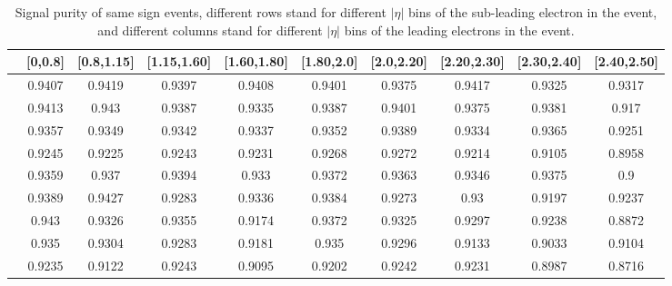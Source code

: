 \begin{table}
\footnotesize
\centering
\begin{tabular}{c|c|c|c|c|c|c|c|c|c}
  \hline
   &[0,0.8] &[0.8,1.15] &[1.15,1.60] &[1.60,1.80] &[1.80,2.0] &[2.0,2.20] &[2.20,2.30] &[2.30,2.40] &[2.40,2.50] \\
  \hline
  [0,0.8] &0.9407 &0.9419 &0.9397 &0.9408 &0.9401 &0.9375 &0.9417 &0.9325 &0.9317 \\
  \hline
  [0.8,1.15] &0.9413 &0.943 &0.9387 &0.9335 &0.9387 &0.9401 &0.9375 &0.9381 &0.917 \\
  \hline
  [1.15,1.60] &0.9357 &0.9349 &0.9342 &0.9337 &0.9352 &0.9389 &0.9334 &0.9365 &0.9251 \\
  \hline
  [1.60,1.80] &0.9245 &0.9225 &0.9243 &0.9231 &0.9268 &0.9272 &0.9214 &0.9105 &0.8958 \\
  \hline
  [1.80,2.0] &0.9359 &0.937 &0.9394 &0.933 &0.9372 &0.9363 &0.9346 &0.9375 &0.9 \\
  \hline
  [2.0,2.20] &0.9389 &0.9427 &0.9283 &0.9336 &0.9384 &0.9273 &0.93 &0.9197 &0.9237 \\
  \hline
  [2.20,2.30] &0.943 &0.9326 &0.9355 &0.9174 &0.9372 &0.9325 &0.9297 &0.9238 &0.8872 \\
  \hline
  [2.30,2.40] &0.935 &0.9304 &0.9283 &0.9181 &0.935 &0.9296 &0.9133 &0.9033 &0.9104 \\
  \hline
  [2.40,2.50] &0.9235 &0.9122 &0.9243 &0.9095 &0.9202 &0.9242 &0.9231 &0.8987 &0.8716 \\
  \hline
\end{tabular}
\caption{Signal purity of same sign events, different rows stand for
  different $|\eta|$ bins of the sub-leading electron in the event,
  and different columns stand for different $|\eta|$ bins of the
  leading electrons in the event.}
\label{tab:fSig Nss}
\end{table}

